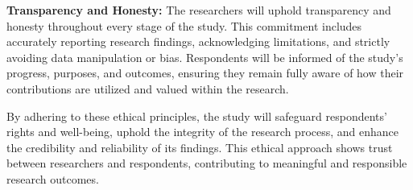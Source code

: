 	\textbf{Transparency and Honesty: } The researchers will uphold transparency and honesty throughout every stage of the study. This commitment includes accurately reporting research findings, acknowledging limitations, and strictly avoiding data manipulation or bias. Respondents will be informed of the study's progress, purposes, and outcomes, ensuring they remain fully aware of how their contributions are utilized and valued within the research.
	
	By adhering to these ethical principles, the study will safeguard respondents' rights and well-being, uphold the integrity of the research process, and enhance the credibility and reliability of its findings. This ethical approach shows trust between researchers and respondents, contributing to meaningful and responsible research outcomes.
